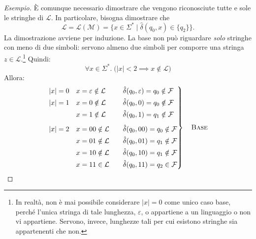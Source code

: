 \documentclass[a4paper, 11pt, oneside]{book}
\theoremstyle{formale}
\newenvironment{esempio}
    {\begin{proof}[\textit{Esempio}]\renewcommand{\qedsymbol}{$\diamond$}}
    {\end{proof}}
\begin{document}
\begin{esempio}
        \`E comunque necessario dimostrare che vengono riconosciute tutte e sole le stringhe
        di $\mathcal{L}$. In particolare, bisogna dimostrare che
        \begin{equation*}
            \mathcal{L} = \mathcal{L}(\mathcal{M})
            = \{x \in \Sigma^* \mid \hat{\delta}(q_0, x) \in \{q_2\}\}.
        \end{equation*}
        La dimostrazione avviene per induzione. La base non pu\`o riguardare \emph{solo}
        stringhe con meno di due simboli: servono almeno due simboli per comporre una stringa
        $z \in \mathcal{L}$.\footnote{In realt\`a, non \`e mai possibile
        considerare $|x| = 0$ come unico caso base, perch\'e l'unica stringa di tale lunghezza,
        $\varepsilon$, o appartiene a un linguaggio o non vi appartiene. Servono, invece,
        lunghezze tali per cui esistono stringhe sia appartenenti che non.} Quindi:
        \begin{equation*}
            \forall x \in \Sigma^*.\; \bigl(|x| < 2 \implies x \notin \mathcal{L}\bigr)
        \end{equation*}
        Allora:
        \begin{equation*}
            \left.
            \begin{alignedat}{3}
                |x| = 0 \quad & x = \varepsilon \notin \mathcal{L} & \qquad
                    & \hat{\delta}(q_0, \varepsilon) = q_0 \notin \mathcal{F} \\
                |x| = 1 \quad & x = 0 \notin \mathcal{L} &
                    & \hat{\delta}(q_0, 0) = q_0 \notin \mathcal{F} \\
                & x = 1 \notin \mathcal{L} &
                    & \hat{\delta}(q_0, 1) = q_1 \notin \mathcal{F} \\[4pt]
                |x| = 2 \quad & x = 00 \notin \mathcal{L} &
                    & \hat{\delta}(q_0, 00) = q_0 \notin \mathcal{F} \\
                & x = 01 \notin \mathcal{L} &
                    & \hat{\delta}(q_0, 01) = q_1 \notin \mathcal{F} \\
                & x = 10 \notin \mathcal{L} &
                    & \hat{\delta}(q_0, 10) = q_1 \notin \mathcal{F} \\
                & x = 11 \in \mathcal{L} &
                    & \hat{\delta}(q_0, 11) = q_2 \in \mathcal{F}
            \end{alignedat}
            \right\}
            \quad \text{\textsc{Base}}
        \end{equation*}


\end{esempio}
\end{document}
